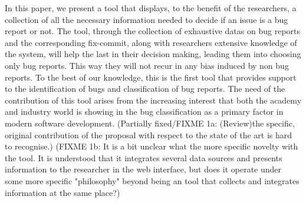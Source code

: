 \documentclass[runningheads,a4paper]{llncs}
\begin{document}
In this paper, we present a tool that displays, to the benefit of the researchers, a collection of all the necessary information needed to decide if an issue is a bug report or not. The tool, through the collection of exhaustive datas on bug reports and the corresponding fix-commit, along with researchers extensive knowledge of the system, will help the last in their decision making, leading them into choosing only bug reports. This way they will not recur in any bias induced by non bug reports. To the best of our knowledge, this is the first tool that provides support to the identification of bugs and classification of bug reports. The need of the contribution of this tool arises from the increasing interest that both the academy and industry world is showing in the bug classification as a primary factor in modern software development.   
(Partially fixed/FIXME 1a: (Review)the specific, original contribution of the proposal with respect to the state of the art is hard to recognise.)%
(FIXME 1b:  It is a bit unclear what the more specific novelty with the tool. It is understood that it integrates several data sources and presents information to the researcher in the web interface, but does it operate under some more specific "philosophy" beyond being an tool that collects and integrates information at the same place?)
\end{document}
